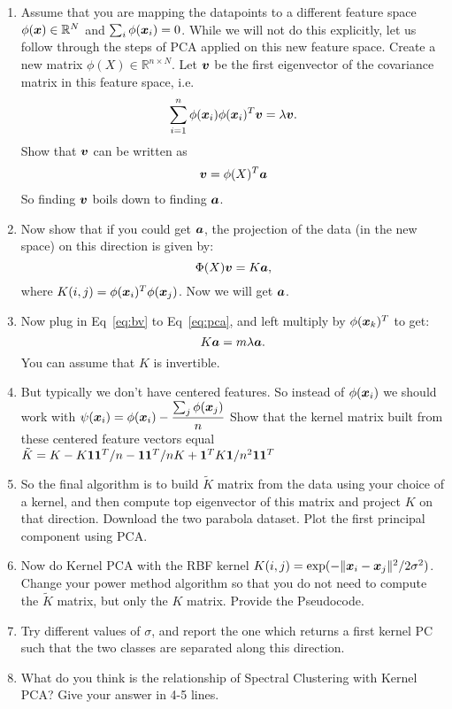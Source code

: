 \documentclass[11pt]{article}
\begin{document}
\begin{enumerate}
\begin{enumerate}
\item Assume that you are mapping the datapoints to a different feature space $\phi(\boldsymbol{x})\in \mathbb{R}^N$ and $\sum_i \phi(\boldsymbol{x}_i)=0$.
While we will not do this explicitly, let us follow through the steps of PCA applied on this new feature space. Create a new matrix $\phi(X)\in\mathbb{R}^{n\times N}$. Let $\boldsymbol{v}$ be the first eigenvector of the covariance matrix in this feature space, i.e.
\begin{align}
\label{eq:pca}
\sum_{i=1}^n\phi(\boldsymbol{x}_i)\phi(\boldsymbol{x}_i)^T\boldsymbol{v}=\lambda \boldsymbol{v}.
\end{align}
 Show that $\boldsymbol{v}$ can be written as 
\begin{align}\label{eq:bv}
\boldsymbol{v}=\phi(X)^T\boldsymbol{a}
\end{align}
So finding $\boldsymbol{v}$ boils down to finding $\boldsymbol{a}$. 
\item Now show that if you could get $\boldsymbol{a}$, the projection of the data (in the new space) on this direction is given by:
$$\Phi(X)\boldsymbol{v}=K\boldsymbol{a},$$
where $K(i,j)=\phi(\boldsymbol{x}_i)^T\phi(\boldsymbol{x}_j)$. Now we will get $\boldsymbol{a}$.
\item Now plug in Eq~\eqref{eq:bv} to Eq~\eqref{eq:pca}, and left multiply by $\phi(\boldsymbol{x}_k)^T$ to get:
$$K\boldsymbol{a}=m\lambda \boldsymbol{a}.$$
You can assume that $K$ is invertible.
\item But typically we don't have centered features. So instead of $\phi(\boldsymbol{x}_i)$ we should work with $\psi(\boldsymbol{x}_i)=\phi(\boldsymbol{x}_i)-\dfrac{\sum_j \phi(\boldsymbol{x}_j)}{n}$
Show that the kernel matrix built from these centered feature vectors equal $\tilde{K}=K-K\boldsymbol{1}\boldsymbol{1}^T/n-\boldsymbol{1}\boldsymbol{1}^T/nK+\boldsymbol{1}^TK\boldsymbol{1}/n^2\boldsymbol{1}\boldsymbol{1}^T$
\item So the final algorithm is to build $\tilde{K}$ matrix from the data using your choice of a kernel, and then compute top eigenvector of this matrix and project $K$ on that direction. Download the two parabola dataset. Plot the first principal component using PCA. 
\item Now do Kernel PCA with the RBF kernel $K(i,j)=\exp(-\|\boldsymbol{x}_i-\boldsymbol{x}_j\|^2/2\sigma^2)$. Change your power method algorithm so that you do not need to compute the $\tilde{K}$ matrix, but only the $K$ matrix. Provide the Pseudocode.
\item Try different values of $\sigma$, and report the one which returns a first kernel PC such that the two classes are separated along this direction.
\item What do you think is the relationship of Spectral Clustering with Kernel PCA? Give your answer in 4-5 lines.
\end{enumerate}
\end{enumerate}
\end{document}
